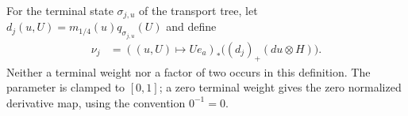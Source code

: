 \begin{definition}
    \label{def:replica_fourier_leaf_measure}
    \leanok
    For the terminal state $\sigma_{j,u}$ of the transport tree, let
    $d_j(u,U)=m_{1/4}(u)q_{\sigma_{j,u}}(U)$ and define
    \begin{align}
        \nu_j & =((u,U)\mapsto Ue_a)_*
        \bigl((d_j)_+(du\otimes H)\bigr).
        \label{eq:replica_fourier_measure}
    \end{align}
    Neither a terminal weight nor a factor of two occurs in this definition.
    The parameter is clamped to $[0,1]$; a zero terminal weight gives the zero
    normalized derivative map, using the convention $0^{-1}=0$.
\end{definition}


